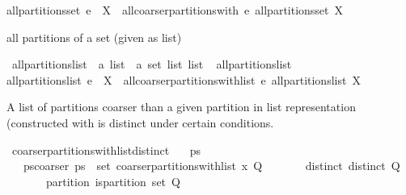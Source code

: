 \begin{isabellebody}
{\isachardoublequoteopen}all{\isacharunderscore}partitions{\isacharunderscore}set\ {\isacharparenleft}e\ {\isacharhash}\ X{\isacharparenright}\ {\isacharequal}\ all{\isacharunderscore}coarser{\isacharunderscore}partitions{\isacharunderscore}with\ e\ {\isacharparenleft}all{\isacharunderscore}partitions{\isacharunderscore}set\ X{\isacharparenright}{\isachardoublequoteclose}%
\begin{isamarkuptext}%
all partitions of a set (given as list)%
\end{isamarkuptext}%
\isamarkuptrue%
\isamarkupfalse%
\ all{\isacharunderscore}partitions{\isacharunderscore}list\ {\isacharcolon}{\isacharcolon}\ {\isachardoublequoteopen}{\isacharprime}a\ list\ {\isasymRightarrow}\ {\isacharprime}a\ set\ list\ list{\isachardoublequoteclose}\isanewline
{}\ \isanewline
{\isachardoublequoteopen}all{\isacharunderscore}partitions{\isacharunderscore}list\ {\isacharbrackleft}{\isacharbrackright}\ {\isacharequal}\ {\isacharbrackleft}{\isacharbrackleft}{\isacharbrackright}{\isacharbrackright}{\isachardoublequoteclose}\ {\isacharbar}\isanewline
{\isachardoublequoteopen}all{\isacharunderscore}partitions{\isacharunderscore}list\ {\isacharparenleft}e\ {\isacharhash}\ X{\isacharparenright}\ {\isacharequal}\ all{\isacharunderscore}coarser{\isacharunderscore}partitions{\isacharunderscore}with{\isacharunderscore}list\ e\ {\isacharparenleft}all{\isacharunderscore}partitions{\isacharunderscore}list\ X{\isacharparenright}{\isachardoublequoteclose}%
\begin{isamarkuptext}%
A list of partitions coarser than a given partition in list representation (constructed
  with  is distinct under certain conditions.%
\end{isamarkuptext}%
\isamarkuptrue%
\isamarkupfalse%
\ coarser{\isacharunderscore}partitions{\isacharunderscore}with{\isacharunderscore}list{\isacharunderscore}distinct{\isacharcolon}\isanewline
\ \ \ ps\isanewline
\ \ \ ps{\isacharunderscore}coarser{\isacharcolon}\ {\isachardoublequoteopen}ps\ {\isasymin}\ set\ {\isacharparenleft}coarser{\isacharunderscore}partitions{\isacharunderscore}with{\isacharunderscore}list\ x\ Q{\isacharparenright}{\isachardoublequoteclose}\isanewline
\ \ \ \ \ \ \ distinct{\isacharcolon}\ {\isachardoublequoteopen}distinct\ Q{\isachardoublequoteclose}\isanewline
\ \ \ \ \ \ \ partition{\isacharcolon}\ {\isachardoublequoteopen}is{\isacharunderscore}partition\ {\isacharparenleft}set\ Q{\isacharparenright}{\isachardoublequoteclose}\isanewline

\end{isabellebody}
